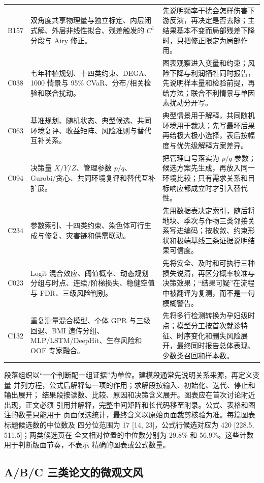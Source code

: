 \documentclass[UTF8,a4paper,12pt]{ctexart}
\begin{document}
\begin{longtable}{p{1.4cm}p{5.2cm}p{7.0cm}}
B157 & 双角度共享物理量与独立标定、内层闭式解、外层非线性拟合、残差触发的 $C^1$ 分段与 Airy 修正。 &
先说明频率干扰会怎样伤害下游反演，再决定是否去除；主结果基本不变而局部残差下降时，只把修正限定为局部作用。\\
C038 & 七年种植规划、十四类约束、DEGA、1000 情景与 95\% CVaR、分布/相关检验和联合扰动。 &
图表观察进入变量和约束；风险下降与利润牺牲同时报告，先说明样本量和检验前提，再给方法；联合不利情景与单因素扰动分开写。\\
C063 & 基准规划、随机状态、典型候选、共同环境复评、收益矩阵、风险准则与替代互补关系。 &
典型情景用于解释，共同随机环境用于裁决；先写最坏后果再给极大极小选择，表后按幅度与优先级解释方案差异。\\
C094 & 决策量 $X/Y/Z$、管理参数 $p/q$、Gurobi/贪心、共同环境复评和替代互补扩展。 &
把管理口号落实为 $p/q$ 参数；候选方案先生成，再放入同一环境比较；只有需求关系和目标响应都成立时才引入替代性。\\
C234 & 参数索引、十四类约束、染色体可行生成与修复、灾害链和供需联动。 &
先用数据表决定索引，随后将地块、季次与作物三类邻接关系写进编码；按收敛、约束形状和极端基线三条证据说明结果可信度。\\
C023 & Logit 混合效应、阈值概率、动态规划分组与时点、连续/阶梯损失、稳健空值与 FDR、三级风险判别。 &
先将安全、及时和可执行三种损失说清，再区分概率校准与决策效果；“结果可疑”在流程中被翻译为复测，而不是一句模糊警告。\\
C132 & 重复测量混合模型、个体 GPR 与三级回退、BMI 遗传分组、MLP/LSTM/DeepHit、生存风险和 OOF 专家融合。 &
先将多行检测转换为孕妇级时点；模型分工按首次就诊特征、时序变化和删失风险展开，最终同时报告总体表现、少数类召回和样本数。\\
\bottomrule
\end{longtable}

段落组织以“一个判断配一组证据”为单位。建模段通常先说明关系来源，再定义变量
并列方程，公式后解释每一项的作用；求解段按输入、初始化、迭代、停止和输出展开；
结果段按读数、比较、原因和决策含义展开。图表应在首次讨论附近出现，正文必须
引用并解释，完整中间矩阵和长代码移至附录。公式、表格和图注的数量只能用于
页面候选统计，最终含义以原始页面裁剪核验为准。每篇图表标题候选数的中位数及
四分位范围为 17 [14, 23]，公式行候选对应为 420 [228.5, 511.5]；两类候选页在
全文相对位置的中位数分别为 29.8\% 和 56.9\%。这些计数用于判断版面节奏，不表示
精确的图表或公式数量。

\subsection{A/B/C 三类论文的微观文风}
\end{document}
